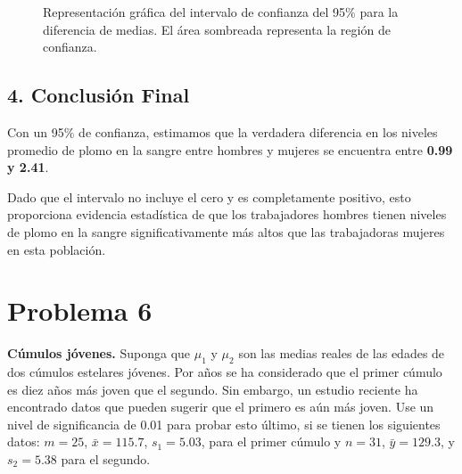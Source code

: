 \documentclass[12pt]{article}
\begin{document}
\begin{figure}[H]
\centering
{}
\caption{Representación gráfica del intervalo de confianza del 95\% para la diferencia de medias. El área sombreada representa la región de confianza.}
\end{figure}

\subsection*{4. Conclusión Final}
Con un 95\% de confianza, estimamos que la verdadera diferencia en los niveles promedio de plomo en la sangre entre hombres y mujeres se encuentra entre \textbf{0.99 y 2.41}. 

Dado que el intervalo no incluye el cero y es completamente positivo, esto proporciona evidencia estadística de que los trabajadores hombres tienen niveles de plomo en la sangre significativamente más altos que las trabajadoras mujeres en esta población.


\section*{Problema 6}

\textbf{Cúmulos jóvenes.} Suponga que $\mu_1$ y $\mu_2$ son las medias reales de las edades de dos cúmulos estelares jóvenes. Por años se ha considerado que el primer cúmulo es diez años más joven que el segundo. Sin embargo, un estudio reciente ha encontrado datos que pueden sugerir que el primero es aún más joven. Use un nivel de significancia de 0.01 para probar esto último, si se tienen los siguientes datos: $m = 25$, $\bar{x} = 115.7$, $s_1 = 5.03$, para el primer cúmulo y $n = 31$, $\bar{y} = 129.3$, y $s_2 = 5.38$ para el segundo.
\end{document}
